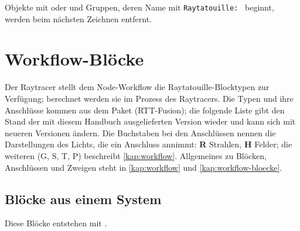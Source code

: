 Objekte mit  oder  und Gruppen, deren Name mit
\texttt{Raytatouille: } beginnt, werden beim nächsten Zeichnen entfernt.

\section{Workflow-Blöcke}\label{sec:ref-rt-bloecke}

Der Raytracer stellt dem Node-Workflow die Raytatouille-Blocktypen zur Verfügung; berechnet werden
sie im Prozess des Raytracers. Die Typen und ihre Anschlüsse kommen aus dem Paket 
(RTT-Fusion); die folgende Liste gibt den Stand der mit diesem Handbuch ausgelieferten Version
wieder und kann sich mit neueren Versionen ändern. Die Buchstaben bei den Anschlüssen nennen die
Darstellungen des Lichts, die ein Anschluss annimmt: \textbf{R} Strahlen, \textbf{H} Felder; die
weiteren (G, S, T, P) beschreibt \autoref{kap:workflow}. Allgemeines zu Blöcken, Anschlüssen und
Zweigen steht in \autoref{kap:workflow} und \autoref{kap:workflow-bloecke}.

\subsection{Blöcke aus einem System}

Diese Blöcke entstehen mit .

